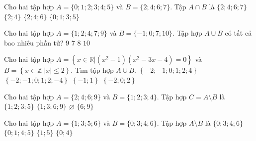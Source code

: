 \begin{ex}%
	Cho hai tập hợp $A=\{0 ; 1 ; 2 ; 3 ; 4 ; 5\}$ và $B=\{2 ; 4 ; 6 ; 7\}$. Tập $A \cap B$ là
	\choice
	{$\{2 ; 4 ; 6 ; 7\}$}
	{\True $\{2 ; 4\}$}
	{$\{2 ; 4 ; 6\}$}
	{$\{0 ; 1 ; 3 ; 5\}$}
\end{ex}
\begin{ex}%
	Cho hai tập hợp $A=\{1 ; 2 ; 4 ; 7 ; 9\}$ và $B=\{-1 ; 0 ; 7 ; 10\}$. Tập hợp $A \cup B$ có tất cả bao nhiêu phần tử?
	\choice
	{$9$}
	{$7$}
	{\True $8$}
	{$10$}
\end{ex}
\begin{ex}%
	Cho hai tập hợp $A=\left\{ x\in \mathbb{R}\big|\left(x^2-1 \right)\left( x^2-3x-4 \right)=0 \right\}$ và $B=\left\{ x\in \mathbb{Z}\big|\left| x \right|\leq 2 \right\}$. Tìm tập hợp $A\cup B$.
	\choice
	{\True $\left\{ -2;-1;0;1;2;4 \right\}$}
	{$\left\{ -2;-1;0;1;2;-4 \right\}$}
	{$\left\{-1;1 \right\}$}
	{$\left\{-2;0;2\right\}$}
\end{ex}
\begin{ex}%
	Cho hai tập hợp $A=\{2 ; 4 ; 6 ; 9\}$ và $B=\{1 ; 2 ; 3 ; 4\}$. Tập hợp $C=A \setminus  B$ là
	\choice
	{$\{1 ; 2 ; 3 ; 5\}$}
	{$\{1 ; 3 ; 6 ; 9\}$}
	{$\varnothing$}
	{\True $\{6 ; 9\}$}
\end{ex}
\begin{ex}%
	Cho hai tập hợp $A=\{1 ; 3 ; 5 ; 6\}$ và $B=\{0 ; 3 ; 4 ; 6\}$. Tập hợp $A \setminus B$ là
	\choice
	{$\{0 ; 3 ; 4 ; 6\}$}
	{$\{0 ; 1 ; 4 ; 5\}$}
	{\True $\{1 ; 5\}$}
	{$\{0 ; 4\}$}
\end{ex}
